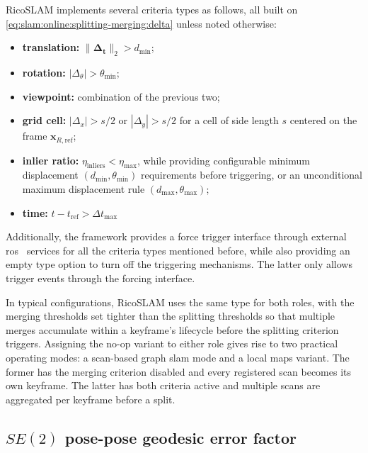 RicoSLAM implements several criteria types as follows, all built on
\eqref{eq:slam:online:splitting-merging:delta} unless noted otherwise:
\begin{itemize}
\item \textbf{translation:} $\|\boldsymbol{\Delta}_{\mathbf{t}}\|_{2} > d_{\min}$;
\item \textbf{rotation:} $|\Delta_{\theta}| > \theta_{\min}$;
\item \textbf{viewpoint:} combination of the previous two;
\item \textbf{grid cell:} $|\Delta_{x}| > s/2$ or $|\Delta_{y}| > s/2$ for a
cell of side length $s$ centered on the frame $\mathbf{x}_{R,\mathrm{ref}}$;
\item \textbf{inlier ratio:} $\eta_{\mathrm{inliers}} < \eta_{\max}$, while
providing configurable minimum displacement $(d_{\min},\theta_{\min})$
requirements before triggering, or an unconditional maximum displacement rule
$(d_{\max},\theta_{\max})$;
\item \textbf{time:} $t-t_{\mathrm{ref}} > \Delta t_{\max}$
\end{itemize}
Additionally, the framework provides a force trigger interface through external
\gls{ros}~\cite{ros} services for all the criteria types mentioned before,
while also providing an empty type option to turn off the triggering mechanisms.
The latter only allows trigger events through the forcing interface.

In typical configurations, RicoSLAM uses the same type for both roles,
with the merging thresholds set tighter than the splitting thresholds so that
multiple merges accumulate within a keyframe's lifecycle before
the splitting criterion triggers. Assigning the no-op variant to either role
gives rise to two practical operating modes: a scan-based graph \gls{slam} mode
and a local maps variant. The former has the merging criterion disabled and
every registered scan becomes its own keyframe. The latter has both criteria
active and multiple scans are aggregated per keyframe before a split.

\subsection{$SE(2)$ pose-pose geodesic error factor}
\label{sec:slam:online:factor}

